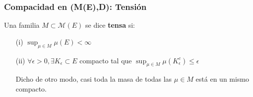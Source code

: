 \subsubsection{Compacidad en (M(E),D): Tensión}
\begin{definition}
\label{def:tension}
Una familia $M\subset\mathcal{M}(E)$ se dice \textbf{tensa} si:
\begin{itemize}
    \item[(i)] $\displaystyle\sup_{\mu\in M}\mu(E)<\infty$
    \item[(ii)] $\forall \epsilon >0, \exists K_\epsilon\subset E$ compacto tal que $\displaystyle\sup_{\mu\in M}\mu(K_\epsilon^c)\leq \epsilon$
    
Dicho de otro modo, casi toda la masa de todas las $\mu\in M$ está en un mismo compacto.
\end{itemize}
\end{definition}

